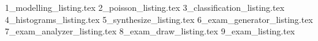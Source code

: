 \begin{appendices}
{1_modelling_listing.tex}
{2_poisson_listing.tex}
{3_classification_listing.tex}
{4_histograms_listing.tex}
{5_synthesize_listing.tex}
{6_exam_generator_listing.tex}
{7_exam_analyzer_listing.tex}
{8_exam_draw_listing.tex}
{9_exam_listing.tex}

\end{appendices}
